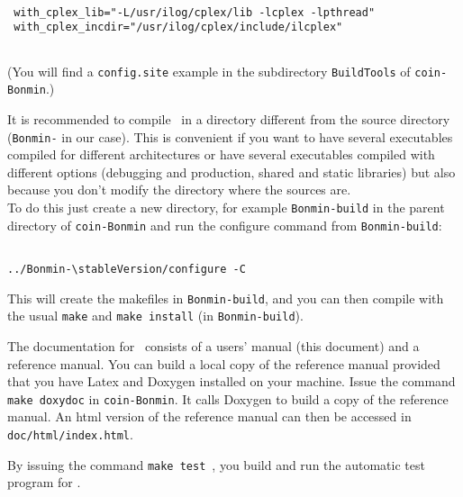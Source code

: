 \begin{colorverb}
 \begin{verbatim}

 with_cplex_lib="-L/usr/ilog/cplex/lib -lcplex -lpthread"
 with_cplex_incdir="/usr/ilog/cplex/include/ilcplex"
 
 \end{verbatim}
\end{colorverb}

 (You will find a {\tt config.site} example in the subdirectory {\tt BuildTools} of {\tt coin-Bonmin}.)

It is recommended to compile \Bonmin\ in a directory different from the source directory ({\tt Bonmin-\stableVersion} in our case).
This is convenient if you want to have several executables compiled for different architectures or have several executables compiled with different options
(debugging and production, shared and static libraries) but also because
you don't modify the directory where the sources are.\\

To do this just create a new directory, for example {\tt Bonmin-build} in the parent directory of
{\tt coin-Bonmin} and run the configure command from {\tt Bonmin-build}:


\begin{colorverb}
\begin{verbatim}

../Bonmin-\stableVersion/configure -C

\end{verbatim}
\end{colorverb}

This will create the makefiles in {\tt Bonmin-build}, and
you can then compile with the usual {\tt make} and {\tt make install}
(in {\tt Bonmin-build}).

The documentation for \Bonmin\ consists of a users' manual (this document) and a reference manual.
You can build a local copy of the reference manual provided that you have Latex
and Doxygen installed on your machine. Issue the command {\tt make
doxydoc} in {\tt coin-Bonmin}. It calls Doxygen to build a copy of the
reference manual. An html version of the reference manual can then
be accessed in {\tt doc/html/index.html}.


By issuing the command {\tt make test}~, you build and run the automatic test program for \Bonmin.
